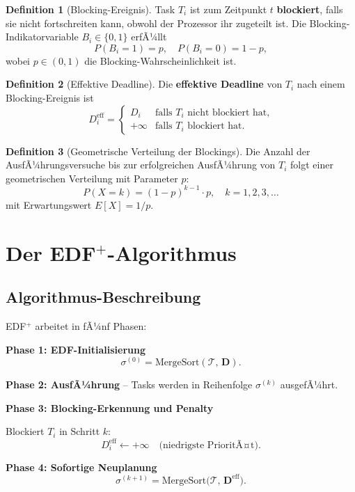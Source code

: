 ﻿\documentclass[a4paper,12pt]{report}
\theoremstyle{definition}
\newtheorem{definition}{Definition}[chapter]
\begin{document}
\begin{definition}[Blocking-Ereignis]
	Task $T_i$ ist zum Zeitpunkt $t$ \textbf{blockiert}, falls sie nicht
	fortschreiten kann, obwohl der Prozessor ihr zugeteilt ist. Die Blocking-Indikatorvariable $B_i \in \{0,1\}$ erfÃ¼llt
	\[
		P(B_i = 1) = p, \quad P(B_i = 0) = 1-p,
	\]
	wobei $p \in (0,1)$ die Blocking-Wahrscheinlichkeit ist.
\end{definition}

\begin{definition}[Effektive Deadline]
	Die \textbf{effektive Deadline} von $T_i$ nach einem Blocking-Ereignis ist
	\[
		D_i^{\text{eff}} = \begin{cases}
			D_i      & \text{falls } T_i \text{ nicht blockiert hat,} \\
			+\infty  & \text{falls } T_i \text{ blockiert hat.}
		\end{cases}
	\]
\end{definition}

\begin{definition}[Geometrische Verteilung der Blockings]
	Die Anzahl der AusfÃ¼hrungsversuche bis zur erfolgreichen AusfÃ¼hrung von $T_i$
	folgt einer geometrischen Verteilung mit Parameter $p$:
	\[
		P(X = k) = (1-p)^{k-1} \cdot p, \quad k = 1, 2, 3, \ldots
	\]
	mit Erwartungswert $E[X] = 1/p$.
\end{definition}

\section{Der EDF$^+$-Algorithmus}

\subsection{Algorithmus-Beschreibung}

EDF$^+$ arbeitet in fÃ¼nf Phasen:

\textbf{Phase 1: EDF-Initialisierung}
\[
	\sigma^{(0)} = \mathrm{MergeSort}(\mathcal{T},\, \mathbf{D}).
\]

\textbf{Phase 2: AusfÃ¼hrung} -- Tasks werden in Reihenfolge $\sigma^{(k)}$ ausgefÃ¼hrt.

\textbf{Phase 3: Blocking-Erkennung und Penalty}

Blockiert $T_i$ in Schritt $k$:
\[
	D_i^{\text{eff}} \leftarrow +\infty \quad \text{(niedrigste PrioritÃ¤t)}.
\]

\textbf{Phase 4: Sofortige Neuplanung}
\[
	\sigma^{(k+1)} = \mathrm{MergeSort}\!\bigl(\mathcal{T},\, \mathbf{D}^{\text{eff}}\bigr).
\]
\end{document}
